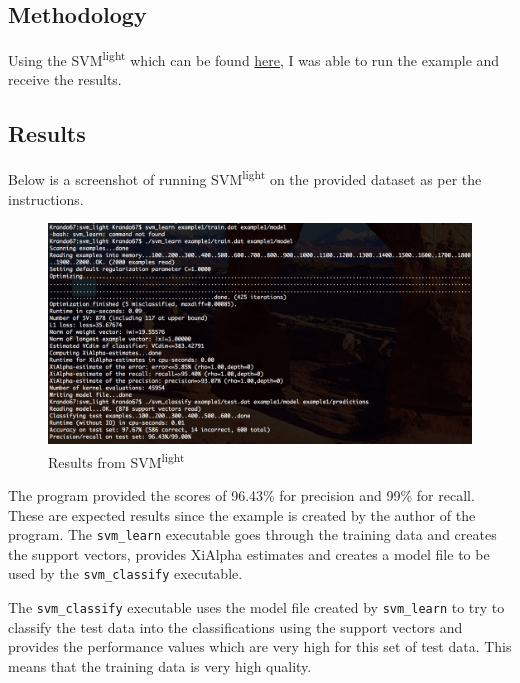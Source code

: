 \documentclass[10pt,letterpaper,bibliography=totoc]{scrartcl}
\begin{document}
\subsection{Methodology}
Using the SVM\textsuperscript{light} which can be found \href{http://www.cs.cornell.edu/people/tj/svm_light/}{here}, I was able to run the example and receive the results. 

\subsection{Results}
Below is a screenshot of running SVM\textsuperscript{light} on the provided dataset as per the instructions.

\begin{figure}[h!]
\centering
\label{fig:svm_light}
\includegraphics[scale=.5]{svm_light_results.png}
\caption{Results from SVM\textsuperscript{light}}
\end{figure}

The program provided the scores of 96.43\% for precision and 99\% for recall. These are expected results since the example is created by the author of the program. The \texttt{svm\_learn} executable goes through the training data and creates the support vectors, provides XiAlpha estimates and creates a model file to be used by the \texttt{svm\_classify} executable. 

The \texttt{svm\_classify} executable uses the model file created by \texttt{svm\_learn} to try to classify the test data into the classifications using the support vectors and provides the performance values which are very high for this set of test data. This means that the training data is very high quality. 

\end{document}
